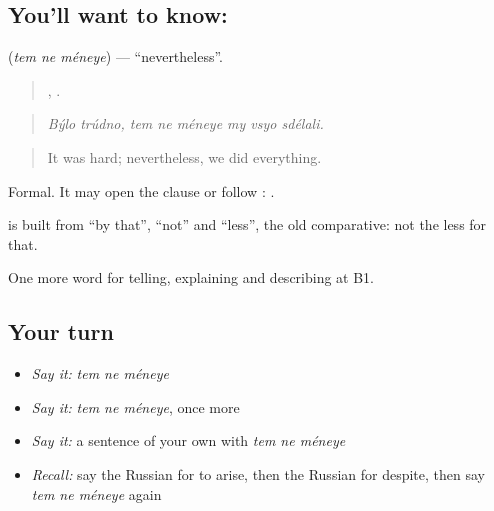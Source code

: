 \subsection*{You'll want to know:   }
\textbf{  } (\emph{tem ne méneye}) — \textquotedblleft{}nevertheless\textquotedblright{}.

\begin{quote}
 ,      .
\end{quote}

\begin{quote}
\emph{Býlo trúdno, tem ne méneye my vsyo sdélali.}
\end{quote}

\begin{quote}
It was hard; nevertheless, we did everything.
\end{quote}

Formal. It may open the clause or follow \emph{}: \emph{   }.

\begin{cousinweb}
\textbf{  } is built from \emph{} \textquotedblleft{}by that\textquotedblright{}, \emph{} \textquotedblleft{}not\textquotedblright{} and \emph{} \textquotedblleft{}less\textquotedblright{}, the old comparative: not the less for that.
\end{cousinweb}

\begin{grammarlens}[title={What you've built}]
One more word for telling, explaining and describing at B1.
\end{grammarlens}

\subsection*{Your turn}
\begin{itemize}
\raggedright
  \item \emph{Say it:} \emph{tem ne méneye}
  \item \emph{Say it:} \emph{tem ne méneye}, once more
  \item \emph{Say it:} a sentence of your own with \emph{tem ne méneye}
  \item \emph{Recall:} say the Russian for to arise, then the Russian for despite, then say \emph{tem ne méneye} again
\end{itemize}

